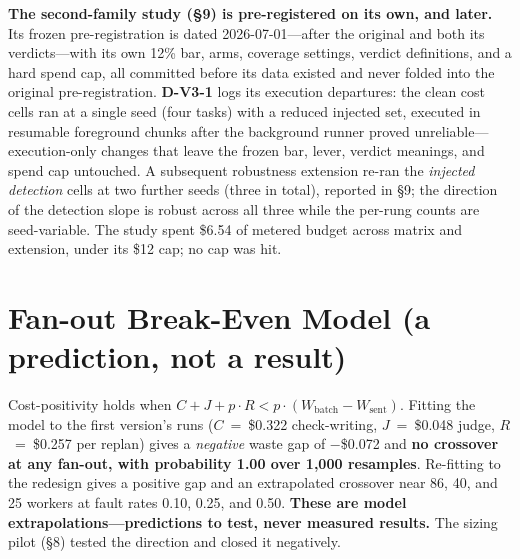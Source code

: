 \documentclass[acmsmall,screen]{acmart}
\begin{document}
\textbf{The second-family study (\S9) is pre-registered on its own, and later.}
Its frozen pre-registration is dated 2026-07-01---after the original and both its
verdicts---with its own 12\% bar, arms, coverage settings, verdict definitions,
and a hard spend cap, all committed before its data existed and never folded into
the original pre-registration. \textbf{D-V3-1} logs its execution departures: the
clean cost cells ran at a single seed (four tasks) with a reduced injected set,
executed in resumable foreground chunks after the background runner proved
unreliable---execution-only changes that leave the frozen bar, lever, verdict
meanings, and spend cap untouched. A subsequent robustness extension re-ran the
\emph{injected detection} cells at two further seeds (three in total), reported in
\S9; the direction of the detection slope is robust across all three while the
per-rung counts are seed-variable. The study spent \$6.54 of metered budget across
matrix and extension, under its \$12 cap; no cap was hit.

\section{Fan-out Break-Even Model (a prediction, not a result)}
Cost-positivity holds when
$C + J + p\cdot R < p\cdot(W_{\mathrm{batch}} - W_{\mathrm{sent}})$. Fitting the
model to the first version's runs ($C$~=~\$0.322 check-writing, $J$~=~\$0.048
judge, $R$~=~\$0.257 per replan) gives a \emph{negative} waste gap of
$-$\$0.072 and \textbf{no crossover at any fan-out, with probability 1.00 over
1,000 resamples}. Re-fitting to the redesign gives a positive gap and an
extrapolated crossover near 86, 40, and 25 workers at fault rates 0.10, 0.25,
and 0.50. \textbf{These are model extrapolations---predictions to test, never
measured results.} The sizing pilot (\S8) tested the direction and closed it
negatively.
\end{document}
